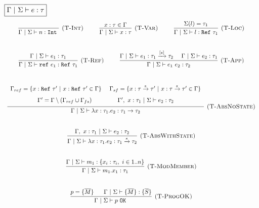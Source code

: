\documentclass{llncs}
\newcommand{\keyw}[1]{\mathtt{#1}~}
\newcommand{\reftt}{\mathtt{ref}~}
\newcommand{\Reftt}{\mathtt{Ref}~}
\newcommand{\Inttt}{\mathtt{Int}~}
\begin{document}
$\fbox{$\Gamma~|~\Sigma \vdash e : \tau$}$
\[
\begin{array}{c}
\infer[\textsc{(T-Int)}]
  {\Gamma~|~\Sigma \vdash n : \Inttt}
  {}
~~~~~~~~  
\infer[\textsc{(T-Var)}]
  {\Gamma~|~\Sigma \vdash x : \tau}
  {x : \tau \in \Gamma}
~~~~~~~~  
\infer[\textsc{(T-Loc)}]
  {\Gamma~|~\Sigma \vdash l : \Reftt \tau_1}
  {\Sigma(l) = \tau_1}\\[5ex]

\infer[\textsc{(T-Ref)}]
  {\Gamma~|~\Sigma \vdash \reftt e_1 : \Reftt \tau_1}
  {\Gamma~|~\Sigma \vdash e_1 : \tau_1}
~~~~~~~~
\infer[\textsc{(T-App)}]
  {\Gamma~|~\Sigma \vdash e_1~e_2 : \tau_2}
  {\Gamma~|~\Sigma \vdash e_1 : \tau_1 \xrightarrow{[s]} \tau_2
  ~~~~ \Gamma~|~\Sigma \vdash e_2 : \tau_1}\\[5ex]

\infer[\textsc{(T-AbsNoState)}]
  {\Gamma~|~\Sigma \vdash \lambda x : \tau_1.e_2 : \tau_1 \rightarrow \tau_2}
  {\def\arraystretch{1.6}
  \begin{array}{c}
\Gamma_{ref} = \{x : \Reftt \tau'~|~ x : \Reftt \tau' \in \Gamma\}~~~~
\Gamma_{sf} = \{ x : \tau \xrightarrow{s} \tau'~|~x : \tau \xrightarrow{s} \tau' \in \Gamma \} \\
\Gamma' = \Gamma \setminus (\Gamma_{ref} \cup \Gamma_{fs})~~~~~~~~~~~~~\Gamma',~x : \tau_1~|~\Sigma \vdash e_2 : \tau_2
  \end{array}}\\[5ex]

\infer[\textsc{(T-AbsWithState)}]
  {\Gamma~|~\Sigma \vdash \lambda x : \tau_1.e_2 : \tau_1 \xrightarrow{s} \tau_2}
  {\Gamma,~x : \tau_1~|~\Sigma \vdash e_2 : \tau_2}\\[5ex]

\infer[\textsc{(T-ModMember)}]
  {\Gamma~|~\Sigma \vdash m_1.x_1 : \tau_1}
  {\Gamma~|~\Sigma \vdash m_1 : \{ x_i : \tau_i,~i \in 1..n\}}\\[5ex]


\infer[\textsc{(T-ProgOK)}]
  {\Gamma~|~\Sigma \vdash p~ \keyw{OK}}
  {p = \{\overline{M}\}~~~~~\Gamma~|~\Sigma \vdash \{\overline{M}\} : \{\overline{S}\}}\\[5ex]


\end{array}\]
\end{document}
